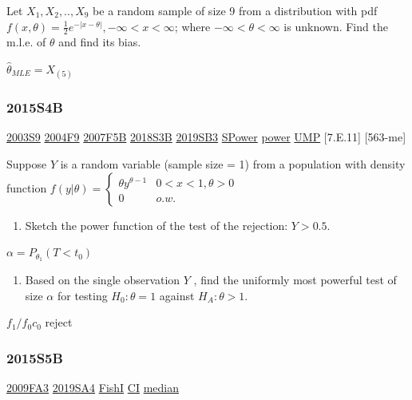 \documentclass[10pt,twocolumn,portrait]{article}
\providecommand{\tightlist}{%
  \setlength{\itemsep}{0pt}\setlength{\parskip}{0pt}}
\begin{document}
Let \(X_1,X_2,..,X_9\) be a random sample of size 9 from a distribution
with pdf \(f(x,\theta) =\frac12e^{-|x-\theta|}, -\infty<x<\infty\);
where \(-\infty<\theta<\infty\) is unknown. Find the m.l.e. of
\(\theta\) and find its bias.

\(\hat\theta_{MLE}=X_{(5)}\)

\hypertarget{s4b-1}{%
\subsubsection{2015S4B}\label{s4b-1}}

\protect\hyperlink{s9}{2003S9} \protect\hyperlink{f9-2}{2004F9}
\protect\hyperlink{f5b}{2007F5B} \protect\hyperlink{s3b-2}{2018S3B}
\protect\hyperlink{sb3-3}{2019SB3} \protect\hyperlink{SPower}{SPower}
\protect\hyperlink{power}{power} \protect\hyperlink{section-7}{UMP}
{[}7.E.11{]}\protect\hyperlink{section}{} {[}563-me{]}

Suppose \(Y\) is a random variable (sample size = 1) from a population
with density function
\(f(y|\theta)=\begin{cases}\theta y^{\theta-1}& 0<x<1,\theta>0\\0& o.w.\end{cases}\)

\begin{enumerate}
\def\labelenumi{(\alph{enumi})}
\tightlist
\item
  Sketch the power function of the test of the rejection: \(Y>0.5\).
\end{enumerate}

\(\alpha=P_{\theta_1}(T<t_0)\)

\begin{enumerate}
\def\labelenumi{(\alph{enumi})}
\setcounter{enumi}{1}
\tightlist
\item
  Based on the single observation \(Y\) , find the uniformly most
  powerful test of size \(\alpha\) for testing \(H_0:\theta=1\) against
  \(H_A :\theta>1\).
\end{enumerate}

\(f_1/f_0c_0\) reject

\hypertarget{s5b-1}{%
\subsubsection{2015S5B}\label{s5b-1}}

\protect\hyperlink{fa3}{2009FA3} \protect\hyperlink{sa4-3}{2019SA4}
\protect\hyperlink{section-5}{FishI} \protect\hyperlink{CI}{CI}
\protect\hyperlink{median}{median}
\end{document}
